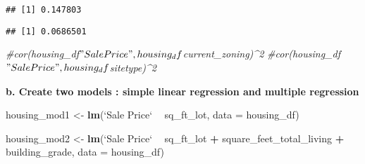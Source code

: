 \documentclass[
]{article}
\newenvironment{Shaded}{\begin{snugshade}}{\end{snugshade}}
\newcommand{\CommentTok}[1]{\textcolor[rgb]{0.56,0.35,0.01}{\textit{#1}}}
\newcommand{\DataTypeTok}[1]{\textcolor[rgb]{0.13,0.29,0.53}{#1}}
\newcommand{\DecValTok}[1]{\textcolor[rgb]{0.00,0.00,0.81}{#1}}
\newcommand{\KeywordTok}[1]{\textcolor[rgb]{0.13,0.29,0.53}{\textbf{#1}}}
\newcommand{\NormalTok}[1]{#1}
\newcommand{\OperatorTok}[1]{\textcolor[rgb]{0.81,0.36,0.00}{\textbf{#1}}}
\newcommand{\StringTok}[1]{\textcolor[rgb]{0.31,0.60,0.02}{#1}}
\begin{document}
\begin{Shaded}
\end{Shaded}

\begin{verbatim}
## [1] 0.147803
\end{verbatim}

\begin{Shaded}
\end{Shaded}

\begin{verbatim}
## [1] 0.0686501
\end{verbatim}

\begin{Shaded}
\begin{Highlighting}[]
\CommentTok{#cor(housing_df$"Sale Price", housing_df$current_zoning)^2}
\CommentTok{#cor(housing_df$"Sale Price", housing_df$sitetype)^2}
\end{Highlighting}
\end{Shaded}

\textbf{b. Create two models : simple linear regression and multiple
regression }

\begin{Shaded}
\begin{Highlighting}[]
\NormalTok{housing_mod1 <-}\StringTok{ }\KeywordTok{lm}\NormalTok{(}\StringTok{`}\DataTypeTok{Sale Price}\StringTok{`} \OperatorTok{~}\StringTok{ }\NormalTok{sq_ft_lot, }\DataTypeTok{data =}\NormalTok{ housing_df)}

\NormalTok{housing_mod2 <-}\StringTok{ }\KeywordTok{lm}\NormalTok{(}\StringTok{`}\DataTypeTok{Sale Price}\StringTok{`} \OperatorTok{~}\StringTok{ }\NormalTok{sq_ft_lot }\OperatorTok{+}\StringTok{ }\NormalTok{square_feet_total_living }\OperatorTok{+}\StringTok{ }\NormalTok{building_grade, }\DataTypeTok{data =}\NormalTok{ housing_df)}
\end{Highlighting}
\end{Shaded}
\end{document}
